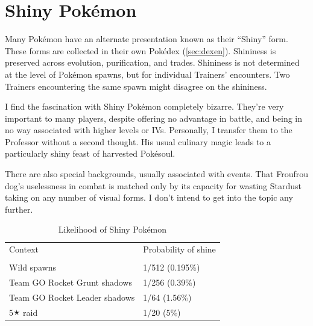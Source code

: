 \section{Shiny Pokémon}
\label{sec:shiny}
Many Pokémon have an alternate presentation known as their ``Shiny'' form.
These forms are collected in their own Pokédex (\autoref{sec:dexen}).
Shininess is preserved across evolution, purification, and trades.
Shininess is not determined at the level of Pokémon spawns, but for individual
  Trainers' encounters.
Two Trainers encountering the same spawn might disagree on the shininess.

I find the fascination with Shiny Pokémon completely bizarre.
They're very important to many players, despite offering no advantage in battle,
  and being in no way associated with higher levels or IVs.
Personally, I transfer them to the Professor without a second thought.
His usual culinary magic leads to a particularly shiny feast of harvested Pokésoul.

There are also special backgrounds, usually associated with events.
That Froufrou dog's uselessness in combat is matched only by its
  capacity for wasting Stardust taking on any number of visual forms.
I don't intend to get into the topic any further.
\begin{table}[ht]
\begin{center}
\begin{tabular}{ll}
Context & Probability of shine \\
\Midrule\\
  Wild spawns & 1/512 (0.195\%) \\
  Team GO Rocket Grunt shadows & 1/256 (0.39\%) \\
  Team GO Rocket Leader shadows & 1/64 (1.56\%) \\
  5🟉 raid & 1/20 (5\%) \\
\end{tabular}
\end{center}
\caption{Likelihood of Shiny Pokémon}
\label{table:shiny}
\end{table}


